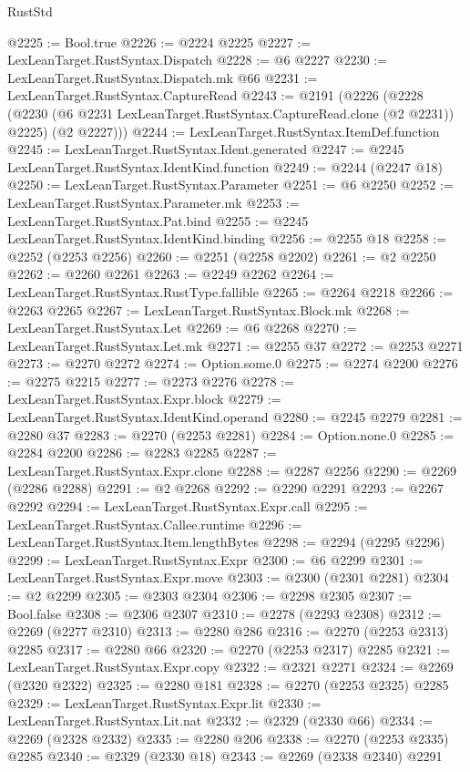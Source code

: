 \begin{lexlean}{RustStd}
\begin{coremodule}
{\begin{coremodule}
{{{{{{{{{{{{@2225 := Bool.true
@2226 := @2224 @2225
@2227 := LexLeanTarget.RustSyntax.Dispatch
@2228 := @6 @2227
@2230 := LexLeanTarget.RustSyntax.Dispatch.mk @66
@2231 := LexLeanTarget.RustSyntax.CaptureRead
@2243 := @2191
    (@2226
      (@2228
        (@2230 (@6 @2231 LexLeanTarget.RustSyntax.CaptureRead.clone (@2 @2231)) @2225)
        (@2 @2227)))
@2244 := LexLeanTarget.RustSyntax.ItemDef.function
@2245 := LexLeanTarget.RustSyntax.Ident.generated
@2247 := @2245 LexLeanTarget.RustSyntax.IdentKind.function
@2249 := @2244 (@2247 @18)
@2250 := LexLeanTarget.RustSyntax.Parameter
@2251 := @6 @2250
@2252 := LexLeanTarget.RustSyntax.Parameter.mk
@2253 := LexLeanTarget.RustSyntax.Pat.bind
@2255 := @2245 LexLeanTarget.RustSyntax.IdentKind.binding
@2256 := @2255 @18
@2258 := @2252 (@2253 @2256)
@2260 := @2251 (@2258 @2202)
@2261 := @2 @2250
@2262 := @2260 @2261
@2263 := @2249 @2262
@2264 := LexLeanTarget.RustSyntax.RustType.fallible
@2265 := @2264 @2218
@2266 := @2263 @2265
@2267 := LexLeanTarget.RustSyntax.Block.mk
@2268 := LexLeanTarget.RustSyntax.Let
@2269 := @6 @2268
@2270 := LexLeanTarget.RustSyntax.Let.mk
@2271 := @2255 @37
@2272 := @2253 @2271
@2273 := @2270 @2272
@2274 := Option.some.{0}
@2275 := @2274 @2200
@2276 := @2275 @2215
@2277 := @2273 @2276
@2278 := LexLeanTarget.RustSyntax.Expr.block
@2279 := LexLeanTarget.RustSyntax.IdentKind.operand
@2280 := @2245 @2279
@2281 := @2280 @37
@2283 := @2270 (@2253 @2281)
@2284 := Option.none.{0}
@2285 := @2284 @2200
@2286 := @2283 @2285
@2287 := LexLeanTarget.RustSyntax.Expr.clone
@2288 := @2287 @2256
@2290 := @2269 (@2286 @2288)
@2291 := @2 @2268
@2292 := @2290 @2291
@2293 := @2267 @2292
@2294 := LexLeanTarget.RustSyntax.Expr.call
@2295 := LexLeanTarget.RustSyntax.Callee.runtime
@2296 := LexLeanTarget.RustSyntax.Item.lengthBytes
@2298 := @2294 (@2295 @2296)
@2299 := LexLeanTarget.RustSyntax.Expr
@2300 := @6 @2299
@2301 := LexLeanTarget.RustSyntax.Expr.move
@2303 := @2300 (@2301 @2281)
@2304 := @2 @2299
@2305 := @2303 @2304
@2306 := @2298 @2305
@2307 := Bool.false
@2308 := @2306 @2307
@2310 := @2278 (@2293 @2308)
@2312 := @2269 (@2277 @2310)
@2313 := @2280 @286
@2316 := @2270 (@2253 @2313) @2285
@2317 := @2280 @66
@2320 := @2270 (@2253 @2317) @2285
@2321 := LexLeanTarget.RustSyntax.Expr.copy
@2322 := @2321 @2271
@2324 := @2269 (@2320 @2322)
@2325 := @2280 @181
@2328 := @2270 (@2253 @2325) @2285
@2329 := LexLeanTarget.RustSyntax.Expr.lit
@2330 := LexLeanTarget.RustSyntax.Lit.nat
@2332 := @2329 (@2330 @66)
@2334 := @2269 (@2328 @2332)
@2335 := @2280 @206
@2338 := @2270 (@2253 @2335) @2285
@2340 := @2329 (@2330 @18)
@2343 := @2269 (@2338 @2340) @2291
}}}}}}}}}}}}
\end{coremodule}}
\end{coremodule}
\end{lexlean}

